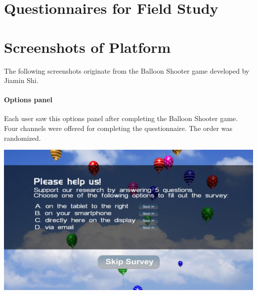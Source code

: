 \clearpage
\section{Questionnaires for Field Study}
\label{appendix:interviews}

  \label{appendix:interview-participant}
  

  \label{appendix:interview-passerby}
  

  \label{appendix:semi-structured-interview}
  



\clearpage
\section{Screenshots of Platform}
\label{appendix:screenshots-balloon-shooter}

    The following screenshots originate from the Balloon Shooter game developed by Jiamin Shi.


\paragraph{Options panel}
Each user saw this options panel after completing the Balloon Shooter game. Four channels were offered for completing the questionnaire. The order was randomized.
 \label{screenshot:options}
    \begin{center}
        \includegraphics[width=\columnwidth]{img/screenshots/balloon-game/options-overview.jpg}
    \end{center}




